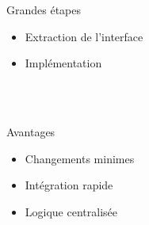 \begin{frame}
\begin{minipage}[c]{.6\linewidth}
\begin{minipage}[c]{\linewidth}
\begin{beamerboxesrounded}[shadow=true]{Grandes étapes}
\begin{itemize}
	\item Extraction de l'interface
	\item Implémentation
\end{itemize}
\end{beamerboxesrounded}
\end{minipage}
~\\
~\\
\begin{minipage}[c]{\linewidth}
\begin{beamerboxesrounded}[shadow=true]{Avantages}
\begin{itemize}
	\item Changements minimes
	\item Intégration rapide
	\item Logique centralisée
\end{itemize}
\end{beamerboxesrounded}
\end{minipage}
\end{minipage}
\end{frame}

